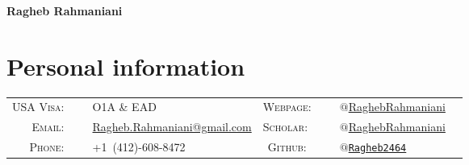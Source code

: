 \documentclass[10PT,letter]{article}
\title{}
\newcommand{\numbox}[1]{} %
\begin{document}
\noindent{}%
{
	\fontsize{34}{36}\mdseries\upshape\sffamily\bfseries Ragheb Rahmaniani
}

\vspace{1.0cm}

\section*{\numbox{1}\bfseries\textcolor{titlecol}{\sffamily Personal information}}
              \begin{tabular}{rlcrl}
	               \small\textsc{USA Visa:}~~~ & \small O1A \& EAD 	
	               																					& \small\textsc{Webpage:}~~~ &  \multicolumn{1}{l}{
	               																						\small \href{https://sites.google.com/view/raghebrahmaniani/home}{{$@$RaghebRahmaniani }}
	               																					}
	               \\[.5mm]
	               
	                \small\textsc{Email:}~~~ & \small {\href{mailto:ragheb.rahmaniani@gmail.com}{Ragheb.Rahmaniani@gmail.com}}   
	                																				& \small\textsc{Scholar:} ~~~ &  \multicolumn{1}{l}{
	                																					\small  \small\href{https://scholar.google.com/citations?user=3V2o0Q0AAAAJ\&hl=en}{$@$RaghebRahmaniani}
	                																				}
	                \\[.5mm]
	                \small\textsc{Phone:}~~~ & \small +1~(412)-608-8472   
	                																				&  \small\textsc{Github:}~~~ & \multicolumn{1}{l}{
	                																					\small \small\href{https://github.com/Ragheb2464}{\texttt{$@$Ragheb2464}}  
                																					}
					\\[.5mm]	               
              \end{tabular}
\end{document}
